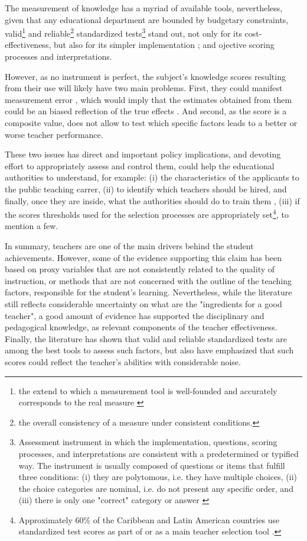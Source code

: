 {The measurement of knowledge has a myriad of available tools, nevertheless, given that any educational department are bounded by budgetary constraints, valid\footnote{the extend to which a measurement tool is well-founded and accurately corresponds to the real measure \cite{Kelley_1927}} and reliable\footnote{the overall consistency of a measure under consistent conditions.} standardized tests\footnote{Assessment instrument in which the implementation, questions, scoring processes, and interpretations are consistent with a predetermined or typified way. The instrument is usually composed of questions or items that fulfill three conditions: (i) they are polytomous, i.e. they have multiple choices, (ii) the choice categories are nominal, i.e. do not present any specific order, and (iii) there is only one "correct" category or answer \cite{Rivera_2019}} stand out, not only for its cost-effectiveness, but also for its simpler implementation \cite{Hincapie_et_al_2020}; and ojective scoring processes and interpretations.

However, as no instrument is perfect, the subject's knowledge scores resulting  from their use will likely have two main problems. First, they could manifest measurement error \cite{Metzler_et_al_2012}, which would imply that the estimates obtained from them could be an biased reflection of the true effects \cite{Angrist_et_al_1999}. And second, as the score is a composite value, does not allow to test which specific factors leads to a better or worse teacher performance.

These two issues has direct and important policy implications, and devoting effort to appropriately assess and control them, could help the educational authorities to understand, for example: (i) the characteristics of the applicants to the public teaching carrer, (ii) to identify which teachers should be hired, and finally, once they are inside, what the authorities should do to train them \cite{Hanushek_et_al_2012}, (iii) if the scores thresholds used for the selection processes are appropriately set\footnote{Approximately 60\% of the Caribbean and Latin American countries use standardized test scores as part of or as a main teacher selection tool \cite{Hincapie_et_al_2020}.}, to mention a few.

In summary, teachers are one of the main drivers behind the student achievements. However, some of the evidence supporting this claim has been based on proxy variables that are not consistently related to the quality of instruction, or methods that are not concerned with the outline of the teaching factors, responsible for the student's learning. Nevertheless, while the literature still reflects considerable uncertainty on what are the "ingredients for a good teacher", a good amount of evidence has supported the disciplinary and pedagogical knowledge, as relevant components of the teacher effectiveness. Finally, the literature has shown that valid and reliable standardized tests are among the best tools to assess such factors, but also have emphasized that such scores could reflect the teacher's abilities with considerable noise.

}

